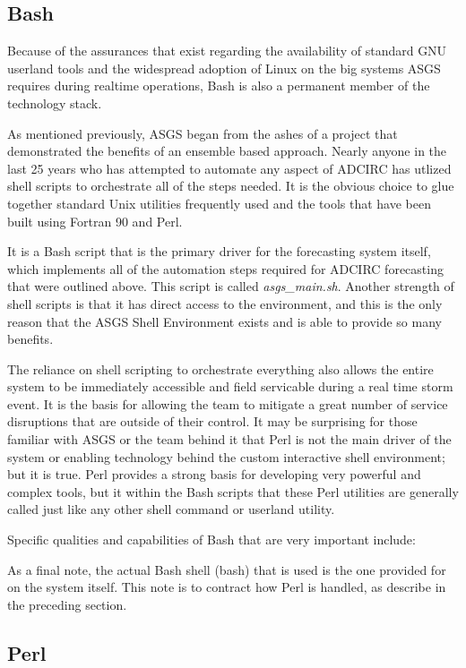 \documentclass{article}
\begin{document}
\subsection{Bash}

Because of the assurances that exist regarding the availability of standard GNU
userland tools and the widespread adoption of Linux on the big systems ASGS
requires during realtime operations, Bash is also a permanent member of the
technology stack.

As mentioned previously, ASGS began from the ashes of a project that
demonstrated the benefits of an ensemble based approach. Nearly anyone in the
last 25 years who has attempted to automate any aspect of ADCIRC has utlized
shell scripts to orchestrate all of the steps needed. It is the obvious choice
to glue together standard Unix utilities frequently used and the tools that have
been built using Fortran 90 and Perl.

It is a Bash script that is the primary driver for the forecasting system
itself, which implements all of the automation steps required for ADCIRC
forecasting that were outlined above. This script is called \textit{asgs\_main.sh}.
Another strength of shell scripts is that it has direct access to the
environment, and this is the only reason that the ASGS Shell Environment exists
and is able to provide so many benefits.

The reliance on shell scripting to orchestrate everything also allows the entire
system to be immediately accessible and field servicable during a real time
storm event. It is the basis for allowing the team to mitigate a great number of
service disruptions that are outside of their control. It may be surprising for
those familiar with ASGS or the team behind it that Perl is not the main driver
of the system or enabling technology behind the custom interactive shell
environment; but it is true. Perl provides a strong basis for developing very
powerful and complex tools, but it within the Bash scripts that these Perl
utilities are generally called just like any other shell command or userland
utility.

Specific qualities and capabilities of Bash that are very important include:

As a final note, the actual Bash shell (bash) that is used is the one provided
for on the system itself. This note is to contract how Perl is handled, as
describe in the preceding section.

\subsection{Perl}
\end{document}
